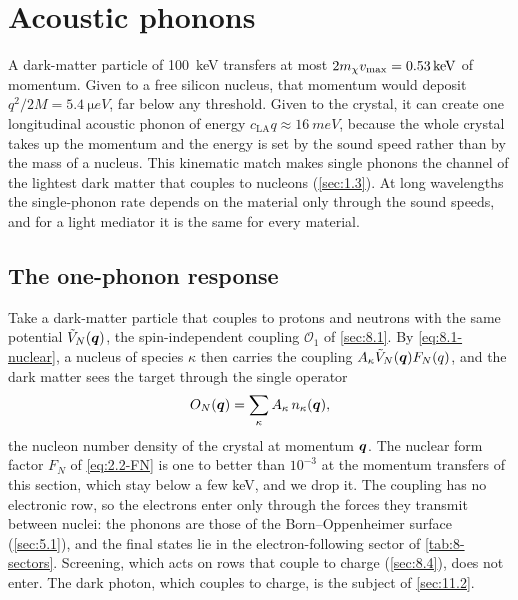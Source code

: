 \section{Acoustic phonons}\label{sec:11.1}

A dark-matter particle of \SI{100}{keV} transfers at most $2m_{\chi} v_{\mathrm{max}} = \SI{0.53}{keV}$ of momentum. Given to a free silicon nucleus, that momentum would deposit $q^2/2M = \SI{5.4}{\micro eV}$, far below any threshold. Given to the crystal, it can create one longitudinal acoustic phonon of energy $c_{\mathrm{LA}}q \approx \SI{16}{meV}$, because the whole crystal takes up the momentum and the energy is set by the sound speed rather than by the mass of a nucleus. This kinematic match makes single phonons the channel of the lightest dark matter that couples to nucleons (\cref{sec:1.3}). At long wavelengths the single-phonon rate depends on the material only through the sound speeds, and for a light mediator it is the same for every material.

\subsection{The one-phonon response}

Take a dark-matter particle that couples to protons and neutrons with the same potential $\tilde V_N(\bm{q})$, the spin-independent coupling $\mathcal{O}_1$ of \cref{sec:8.1}. By \cref{eq:8.1-nuclear}, a nucleus of species $\kappa$ then carries the coupling $A_\kappa\tilde V_N(\bm{q})F_N(q)$, and the dark matter sees the target through the single operator
\begin{equation*}
  O_N(\bm{q}) = \sum_\kappa A_\kappa\,n_\kappa(\bm{q}) ,
\end{equation*}
the nucleon number density of the crystal at momentum $\bm{q}$. The nuclear form factor $F_N$ of \cref{eq:2.2-FN} is one to better than $10^{-3}$ at the momentum transfers of this section, which stay below a few keV, and we drop it. The coupling has no electronic row, so the electrons enter only through the forces they transmit between nuclei: the phonons are those of the Born--Oppenheimer surface (\cref{sec:5.1}), and the final states lie in the electron-following sector of \cref{tab:8-sectors}. Screening, which acts on rows that couple to charge (\cref{sec:8.4}), does not enter. The dark photon, which couples to charge, is the subject of \cref{sec:11.2}.

